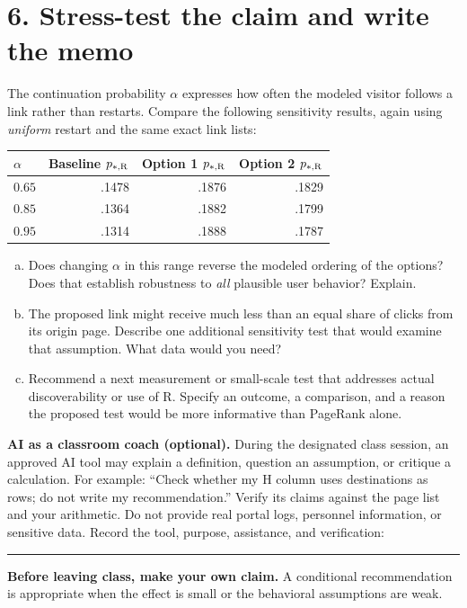 \documentclass[10pt,letterpaper]{article}
\begin{document}
\section*{6. Stress-test the claim and write the memo}
The continuation probability $\alpha$ expresses how often the modeled visitor follows a link rather than restarts. Compare the following sensitivity results, again using \emph{uniform} restart and the same exact link lists:
\begin{center}
\begin{tabular}{@{}lrrr@{}}
\toprule
$\alpha$ & Baseline $p_{*,\rm R}$ & Option 1 $p_{*,\rm R}$ & Option 2 $p_{*,\rm R}$\\
\midrule
$0.65$ & .1478 & .1876 & .1829\\
$0.85$ & .1364 & .1882 & .1799\\
$0.95$ & .1314 & .1888 & .1787\\
\bottomrule
\end{tabular}
\end{center}
\begin{enumerate}[a.,leftmargin=*]
\item Does changing $\alpha$ in this range reverse the modeled ordering of the options? Does that establish robustness to \emph{all} plausible user behavior? Explain.\\[0.48in]
\item The proposed link might receive much less than an equal share of clicks from its origin page. Describe one additional sensitivity test that would examine that assumption. What data would you need?\\[0.52in]
\item Recommend a next measurement or small-scale test that addresses actual discoverability or use of R. Specify an outcome, a comparison, and a reason the proposed test would be more informative than PageRank alone.\\[0.57in]
\end{enumerate}
\newpage
\textbf{AI as a classroom coach (optional).} During the designated class session, an approved AI tool may explain a definition, question an assumption, or critique a calculation. For example: ``Check whether my H column uses destinations as rows; do not write my recommendation.'' Verify its claims against the page list and your arithmetic. Do not provide real portal logs, personnel information, or sensitive data. Record the tool, purpose, assistance, and verification: \rule{\linewidth}{0.4pt}

\textbf{Before leaving class, make your own claim.} A conditional recommendation is appropriate when the effect is small or the behavioral assumptions are weak.
\end{document}
